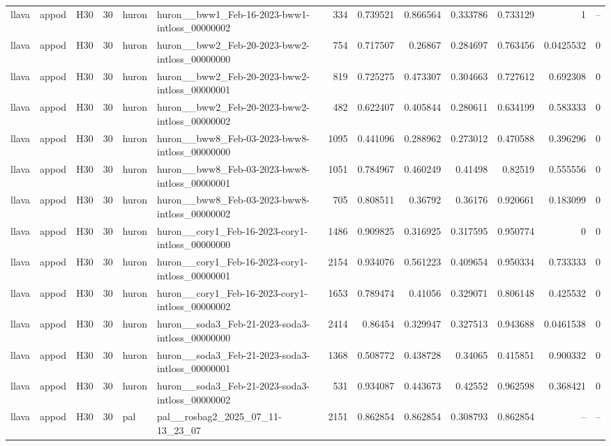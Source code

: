 \begin{longtable}{lllrllrrrrrrr}
llava & appod & H30 & 30 & huron & huron\_\_bww1\_Feb-16-2023-bww1-intloss\_00000002 & 334 & 0.739521 & 0.866564 & 0.333786 & 0.733129 & 1 & -- \\
llava & appod & H30 & 30 & huron & huron\_\_bww2\_Feb-20-2023-bww2-intloss\_00000000 & 754 & 0.717507 & 0.26867 & 0.284697 & 0.763456 & 0.0425532 & 0 \\
llava & appod & H30 & 30 & huron & huron\_\_bww2\_Feb-20-2023-bww2-intloss\_00000001 & 819 & 0.725275 & 0.473307 & 0.304663 & 0.727612 & 0.692308 & 0 \\
llava & appod & H30 & 30 & huron & huron\_\_bww2\_Feb-20-2023-bww2-intloss\_00000002 & 482 & 0.622407 & 0.405844 & 0.280611 & 0.634199 & 0.583333 & 0 \\
llava & appod & H30 & 30 & huron & huron\_\_bww8\_Feb-03-2023-bww8-intloss\_00000000 & 1095 & 0.441096 & 0.288962 & 0.273012 & 0.470588 & 0.396296 & 0 \\
llava & appod & H30 & 30 & huron & huron\_\_bww8\_Feb-03-2023-bww8-intloss\_00000001 & 1051 & 0.784967 & 0.460249 & 0.41498 & 0.82519 & 0.555556 & 0 \\
llava & appod & H30 & 30 & huron & huron\_\_bww8\_Feb-03-2023-bww8-intloss\_00000002 & 705 & 0.808511 & 0.36792 & 0.36176 & 0.920661 & 0.183099 & 0 \\
llava & appod & H30 & 30 & huron & huron\_\_cory1\_Feb-16-2023-cory1-intloss\_00000000 & 1486 & 0.909825 & 0.316925 & 0.317595 & 0.950774 & 0 & 0 \\
llava & appod & H30 & 30 & huron & huron\_\_cory1\_Feb-16-2023-cory1-intloss\_00000001 & 2154 & 0.934076 & 0.561223 & 0.409654 & 0.950334 & 0.733333 & 0 \\
llava & appod & H30 & 30 & huron & huron\_\_cory1\_Feb-16-2023-cory1-intloss\_00000002 & 1653 & 0.789474 & 0.41056 & 0.329071 & 0.806148 & 0.425532 & 0 \\
llava & appod & H30 & 30 & huron & huron\_\_soda3\_Feb-21-2023-soda3-intloss\_00000000 & 2414 & 0.86454 & 0.329947 & 0.327513 & 0.943688 & 0.0461538 & 0 \\
llava & appod & H30 & 30 & huron & huron\_\_soda3\_Feb-21-2023-soda3-intloss\_00000001 & 1368 & 0.508772 & 0.438728 & 0.34065 & 0.415851 & 0.900332 & 0 \\
llava & appod & H30 & 30 & huron & huron\_\_soda3\_Feb-21-2023-soda3-intloss\_00000002 & 531 & 0.934087 & 0.443673 & 0.42552 & 0.962598 & 0.368421 & 0 \\
llava & appod & H30 & 30 & pal & pal\_\_rosbag2\_2025\_07\_11-13\_23\_07 & 2151 & 0.862854 & 0.862854 & 0.308793 & 0.862854 & -- & -- \\

\end{longtable}
